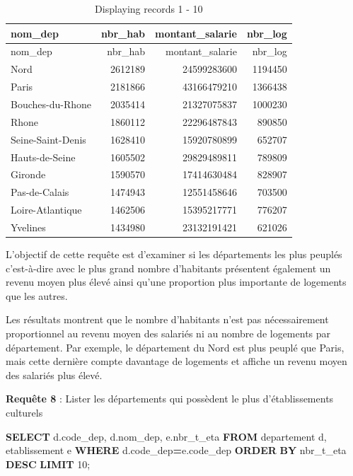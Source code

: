 \documentclass[mstat,12pt]{unswthesis}
\newenvironment{Shaded}{\begin{snugshade}}{\end{snugshade}}
\newcommand{\DecValTok}[1]{\textcolor[rgb]{0.00,0.00,0.81}{#1}}
\newcommand{\KeywordTok}[1]{\textcolor[rgb]{0.13,0.29,0.53}{\textbf{#1}}}
\newcommand{\NormalTok}[1]{#1}
\newcommand{\OperatorTok}[1]{\textcolor[rgb]{0.81,0.36,0.00}{\textbf{#1}}}
\begin{document}
\begin{longtable}[]{@{}lrrr@{}}
\caption{Displaying records 1 - 10}\tabularnewline
\toprule\noalign{}
nom\_dep & nbr\_hab & montant\_salarie & nbr\_log \\
\midrule\noalign{}
\endfirsthead
\toprule\noalign{}
nom\_dep & nbr\_hab & montant\_salarie & nbr\_log \\
\midrule\noalign{}
\endhead
\bottomrule\noalign{}
\endlastfoot
Nord & 2612189 & 24599283600 & 1194450 \\
Paris & 2181866 & 43166479210 & 1366438 \\
Bouches-du-Rhone & 2035414 & 21327075837 & 1000230 \\
Rhone & 1860112 & 22296487843 & 890850 \\
Seine-Saint-Denis & 1628410 & 15920780899 & 652707 \\
Hauts-de-Seine & 1605502 & 29829489811 & 789809 \\
Gironde & 1590570 & 17414630484 & 828907 \\
Pas-de-Calais & 1474943 & 12551458646 & 703500 \\
Loire-Atlantique & 1462506 & 15395217771 & 776207 \\
Yvelines & 1434980 & 23132191421 & 621026 \\
\end{longtable}

\medskip

L'objectif de cette requête est d'examiner si les départements les plus
peuplés c'est-à-dire avec le plus grand nombre d'habitants présentent
également un revenu moyen plus élevé ainsi qu'une proportion plus
importante de logements que les autres.

Les résultats montrent que le nombre d'habitants n'est pas
nécessairement proportionnel au revenu moyen des salariés ni au nombre
de logements par département. Par exemple, le département du Nord est
plus peuplé que Paris, mais cette dernière compte davantage de logements
et affiche un revenu moyen des salariés plus élevé.

\medskip

\textbf{Requête 8} : Lister les départements qui possèdent le plus
d'établissements culturels

\begin{Shaded}
\begin{Highlighting}[]
\KeywordTok{SELECT}\NormalTok{ d.code\_dep, d.nom\_dep, e.nbr\_t\_eta}
\KeywordTok{FROM}\NormalTok{ departement d, etablissement e}
\KeywordTok{WHERE}\NormalTok{ d.code\_dep}\OperatorTok{=}\NormalTok{e.code\_dep}
\KeywordTok{ORDER} \KeywordTok{BY}\NormalTok{ nbr\_t\_eta }\KeywordTok{DESC}
\KeywordTok{LIMIT} \DecValTok{10}\NormalTok{;}
\end{Highlighting}
\end{Shaded}
\end{document}
